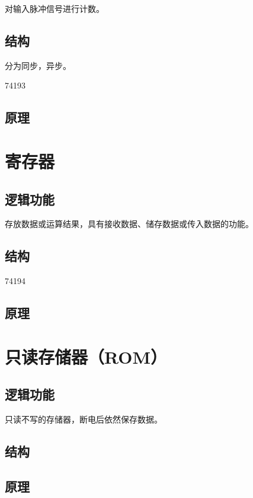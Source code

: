 对输入脉冲信号进行计数。

\subsection{结构}

分为同步，异步。

74193

\subsection{原理}


\newpage
\section{寄存器}

\subsection{逻辑功能}

存放数据或运算结果，具有接收数据、储存数据或传入数据的功能。

\subsection{结构}

74194

\subsection{原理}


\newpage
\section{只读存储器（ROM）}

\subsection{逻辑功能}

只读不写的存储器，断电后依然保存数据。

\subsection{结构}

\subsection{原理}



